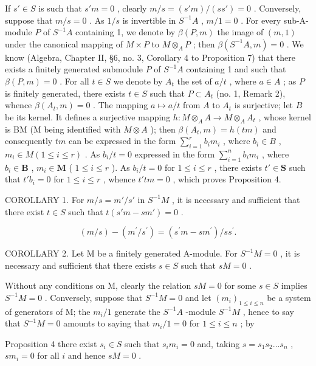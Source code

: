 If \(s' \in S\) is such that \(s'm = 0\) , clearly \(m/s = (s'm)/(ss') = 0\) . Conversely, suppose that \(m/s = 0\) . As \(1/s\) is invertible in \(S^{-1}A\) , \(m/1 = 0\) . For every sub-A-module \(P\) of \(S^{-1}A\) containing 1, we denote by \(\beta(P, m)\) the image of \((m, 1)\) under the canonical mapping of \(M \times P\) to \(M \otimes_A P\) ; then \(\beta(S^{-1}A, m) = 0\) . We know (Algebra, Chapter II, §6, no. 3, Corollary 4 to Proposition 7) that there exists a finitely generated submodule \(P\) of \(S^{-1}A\) containing 1 and such that \(\beta(P, m) = 0\) . For all \(t \in S\) we denote by \(A_t\) the set of \(a/t\) , where \(a \in A\) ; as \(P\) is finitely generated, there exists \(t \in S\) such that \(P \subset A_t\) (no. 1, Remark 2), whence \(\beta(A_t, m) = 0\) . The mapping \(a \mapsto a/t\) from \(A\) to \(A_t\) is surjective; let \(B\) be its kernel. It defines a surjective mapping \(h: M \otimes_A A \to M \otimes_A A_t\) , whose kernel is BM (M being identified with \(M \otimes A\) ); then \(\beta(A_t, m) = h(tm)\) and consequently \(tm\) can be expressed in the form \(\sum_{i=1}^{r} b_i m_i\) , where \(b_i \in B\) , \(m_i \in M (1 \leqslant i \leqslant r)\) . As \(b_i/t = 0\) expressed in the form \(\sum_{i=1}^{n} b_i m_i\) , where \(b_i \in \mathbf{B}\) , \(m_i \in \mathbf{M}\) ( \(1 \leqslant i \leqslant r\) ). As \(b_i / t = 0\) for \(1 \leqslant i \leqslant r\) , there exists \(t' \in \mathbf{S}\) such that \(t'b_i = 0\) for \(1 \leqslant i \leqslant r\) , whence \(t'tm = 0\) , which proves Proposition 4.

COROLLARY 1. For \(m / s = m' / s'\) in \(S^{-1}M\) , it is necessary and sufficient that there exist \(t \in S\) such that \(t(s'm - sm') = 0\) .

\[
(m / s) - (m ^ {\prime} / s ^ {\prime}) = (s ^ {\prime} m - s m ^ {\prime}) / s s ^ {\prime}.
\]

COROLLARY 2. Let M be a finitely generated A-module. For \(S^{-1}M = 0\) , it is necessary and sufficient that there exists \(s \in S\) such that \(sM = 0\) .

Without any conditions on M, clearly the relation \(sM = 0\) for some \(s \in S\) implies \(S^{-1}M = 0\) . Conversely, suppose that \(S^{-1}M = 0\) and let \((m_i)_{1 \leqslant i \leqslant n}\) be a system of generators of M; the \(m_i / 1\) generate the \(S^{-1}A\) -module \(S^{-1}M\) , hence to say that \(S^{-1}M = 0\) amounts to saying that \(m_i / 1 = 0\) for \(1 \leqslant i \leqslant n\) ; by

Proposition 4 there exist \(s_i \in S\) such that \(s_i m_i = 0\) and, taking \(s = s_1 s_2 \ldots s_n\) , \(sm_i = 0\) for all \(i\) and hence \(sM = 0\) .

